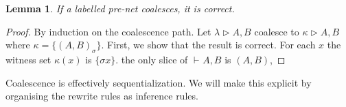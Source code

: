 \documentclass{article}
\theoremstyle{definition}
\theoremstyle{plain}
\newtheorem{lemma}[definition]{Lemma}
\newcommand\defn[1]{\textit{\textbf{#1}}}
\newcommand\+{+}
\renewcommand\*{\times}
\newcommand\seq[3][]{{\vdash_{#1}}#2,#3}
\newcommand\net[3]{#1\triangleright #2,#3}
\newcommand\clink[3][\sigma]{(#2,#3)_{#1}}
\begin{document}
\begin{lemma}
If a labelled pre-net coalesces, it is correct. 
\end{lemma}

\begin{proof}
By induction on the coalescence path. Let $\net\lambda AB$ coalesce to $\net\kappa AB$ where $\kappa=\{\clink AB\}$. First, we show that the result is correct. For each $x$ the witness set $\kappa(x)$ is $\{\sigma x\}$.  the only slice of $\seq AB$ is $(A,B)$, 
\end{proof}



Coalescence is effectively sequentialization. We will make this explicit by organising the rewrite rules as inference rules. 


%
%
%
%
\end{document}
